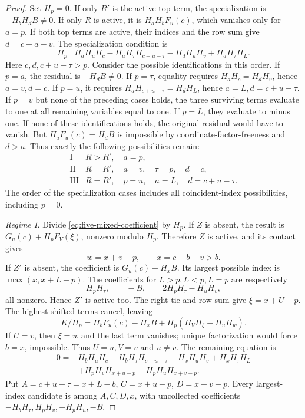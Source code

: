 \documentclass[11pt,a4paper]{amsart}
\numberwithin{equation}{section}
\theoremstyle{plain}
\theoremstyle{definition}
\begin{document}
\begin{proof}
Set \(H_p=0\).  If only \(R'\) is the active top term, the
specialization is \(-H_bH_dB\ne0\).  If only \(R\) is active, it
is \(H_aH_bF_u(c)\), which vanishes only for \(a=p\).  If both top
terms are active, their indices and the row sum give
\(d=c+a-v\).  The specialization condition is
\[
 H_p\mid
 H_aH_uH_c-H_aH_\tau H_{c+u-\tau}
 -H_dH_uH_v+H_dH_\tau H_L.
\]
Here \(c,d,c+u-\tau>p\).  Consider the possible identifications in
this order.  If \(p=a\), the residual is \(-H_dB\ne0\).  If
\(p=\tau\), equality requires \(H_aH_c=H_dH_v\), hence
\(a=v,d=c\).  If \(p=u\), it requires
\(H_aH_{c+u-\tau}=H_dH_L\), hence
\(a=L,d=c+u-\tau\).  If \(p=v\) but none of the preceding cases
holds, the three surviving terms evaluate to one at all remaining
variables equal to one.  If \(p=L\), they evaluate to minus one.  
If none of these identifications holds, the original residual would
have to vanish.  But \(H_aF_u(c)=H_dB\) is impossible by
coordinate-factor-freeness and \(d>a\).  
Thus exactly the following possibilities remain:
\begin{equation}\label{eq:five-mixed-regimes}
 \begin{array}{c|l}
 \mathrm{I}&R>R',\quad a=p,\\
 \mathrm{II}&R=R',\quad a=v,\quad \tau=p,\quad d=c,\\
 \mathrm{III}&R=R',\quad p=u,\quad a=L,\quad d=c+u-\tau.
 \end{array}
\end{equation}
The order of the specialization cases includes all coincident-index
possibilities, including \(p=0\).  

\emph{Regime I.}
Divide \eqref{eq:five-mixed-coefficient} by \(H_p\).  If \(Z\) is
absent, the result is \(G_u(c)+H_pF_V(\xi)\), nonzero modulo
\(H_p\).  Therefore \(Z\) is active, and its contact gives
\[
 w=x+v-p,\qquad x=c+b-v>b.
\]
If \(Z'\) is absent, the coefficient is \(G_u(c)-H_xB\).  
Its largest possible index is \(\max(x,x+L-p)\).  The coefficients
for \(L>p,L<p,L=p\) are respectively
\[
 H_pH_\tau,\qquad -B,\qquad 2H_pH_\tau-H_uH_v,
\]
all nonzero.  Hence \(Z'\) is active too.  The right tie and row sum
give \(\xi=x+U-p\).  The highest shifted terms cancel, leaving
\[
 K/H_p=H_bF_u(c)-H_xB+H_p(H_VH_\xi-H_uH_w).
\]
If \(U=v\), then \(\xi=w\) and the last term vanishes; unique
factorization would force \(b=x\), impossible.  Thus \(U=u,V=v\)
and \(u\ne v\).  The remaining equation is
\[
 \begin{aligned}
 0={}&H_bH_uH_c-H_bH_\tau H_{c+u-\tau}
       -H_xH_uH_v+H_xH_\tau H_L\\
    &+H_pH_vH_{x+u-p}-H_pH_uH_{x+v-p}.
 \end{aligned}
\]
Put \(A=c+u-\tau=x+L-b\), \(C=x+u-p\), \(D=x+v-p\).  
Every largest-index candidate is among \(A,C,D,x\), with uncollected
coefficients \(-H_bH_\tau,H_pH_v,-H_pH_u,-B\).  


\end{proof}
\end{document}
